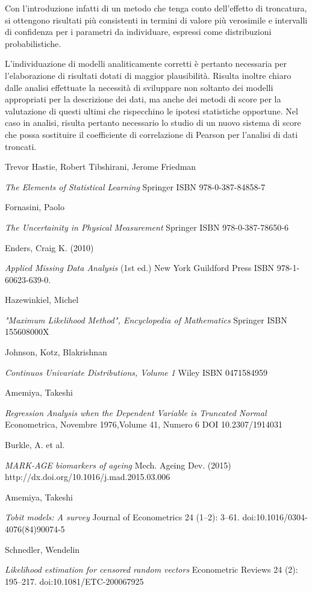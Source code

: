 \documentclass[12pt,openright,twoside,a4paper]{book}
\begin{document}
Con l'introduzione infatti di un metodo che tenga conto dell'effetto di troncatura, si ottengono risultati più consistenti in termini di valore più verosimile e intervalli di confidenza per i parametri da individuare, espressi come distribuzioni probabilistiche.

L'individuazione di modelli analiticamente corretti è pertanto necessaria per l'elaborazione di risultati dotati di maggior plausibilità.
Risulta inoltre chiaro dalle analisi effettuate la necessità di sviluppare non soltanto dei modelli appropriati per la descrizione dei dati, ma anche dei metodi di score per la valutazione di questi ultimi che rispecchino le ipotesi statistiche opportune.
Nel caso in analisi, risulta pertanto necessario lo studio di un nuovo sistema di score che possa sostituire il coefficiente di correlazione di Pearson per l'analisi di dati troncati.

\backmatter
\begin{thebibliography}{99}
Trevor Hastie, Robert Tibshirani, Jerome Friedman

\emph{The Elements of Statistical Learning}
Springer ISBN 978-0-387-84858-7

Fornasini, Paolo

\emph{The Uncertainity in Physical Measurement}
Springer ISBN 978-0-387-78650-6

Enders, Craig K. (2010)

\emph{Applied Missing Data Analysis } (1st ed.)
 New York
 Guildford Press ISBN 978-1-60623-639-0.

Hazewinkiel, Michel

\emph{"Maximum Likelihood Method", Encyclopedia of Mathematics}
Springer ISBN 155608000X

Johnson, Kotz, Blakrishnan

\emph{Continuos Univariate Distributions, Volume 1}
Wiley ISBN 0471584959

Amemiya, Takeshi

\emph{Regression Analysis when the Dependent Variable is Truncated Normal}
Econometrica, Novembre 1976,Volume 41, Numero 6  DOI 10.2307/1914031

Burkle, A. et al.

\emph{MARK-AGE biomarkers of ageing}
Mech. Ageing Dev. (2015) http://dx.doi.org/10.1016/j.mad.2015.03.006

Amemiya, Takeshi

\emph{Tobit models: A survey}
 Journal of Econometrics 24 (1–2): 3–61. doi:10.1016/0304-4076(84)90074-5

Schnedler, Wendelin

\emph{Likelihood estimation for censored random vectors}
Econometric Reviews 24 (2): 195–217. doi:10.1081/ETC-200067925

\end{thebibliography}
\end{document}
